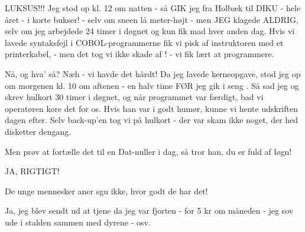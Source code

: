 \documentclass[a4paper,11pt]{article}
\begin{document}
\begin{sketch}
 LUKSUS!!! 
         Jeg stod op kl. 12 om natten - så GIK jeg fra Holbæk til DIKU - hele året - i korte bukser! - selv om sneen lå meter-højt 
         - men JEG klagede ALDRIG, selv om jeg arbejdede 24 timer i døgnet og kun fik mad hver anden dag. Hvis vi lavede syntaksfejl i COBOL-programmerne
         fik vi pisk af instruktoren med et printerkabel, - men det tog vi ikke skade af ! - vi fik lært at programmere.

 Nå, og hva' så?
         Næh - vi havde det hårdt! Da jeg lavede kerneopgave, stod jeg op om morgenen kl. 10 om aftenen  - en halv time
         FØR jeg gik i seng . Så sad jeg og skrev hulkort 30 timer i døgnet, og når programmet var færdigt, bad vi operatøren køre
         det for os. Hvis han var i godt humør, kunne vi hente udskriften dagen efter. Selv back-up'en tog vi på hulkort -
         der var skam ikke noget, der hed disketter dengang.


 Men prøv at fortælle det til en Dat-nuller i dag, så tror han, du er fuld af løgn!

  JA, RIGTIGT!

 De unge mennesker aner sgu ikke, hvor godt de har det!


 Ja, jeg blev sendt ud at tjene da jeg var fjorten - for 5 kr om måneden - jeg sov ude i stalden sammen med dyrene - osv.


\end{sketch}
\end{document}
